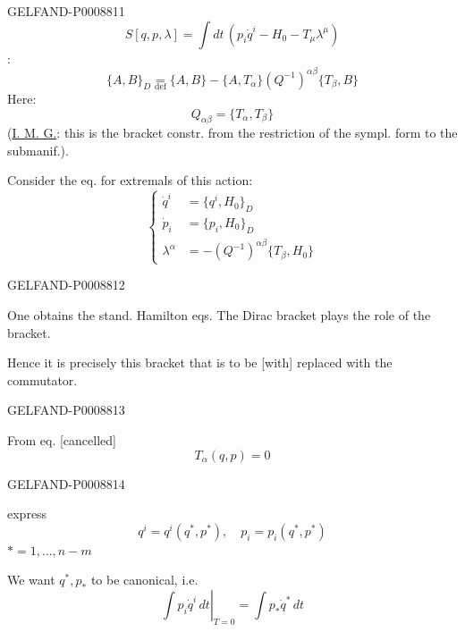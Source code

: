 \begin{GelfandAdjacentEvidence}{GELFAND-P000881}{1}
\begin{equation*}
S[q,p,\lambda]=\int dt\,(p_i\dot q^i-H_0-T_\mu\lambda^\mu)
\tag{11}
\end{equation*}
:
\begin{equation*}
\{A,B\}_D\underset{\mathrm{def}}{=}
\{A,B\}-\{A,T_\alpha\}(Q^{-1})^{\alpha\beta}\{T_\beta,B\}
\tag{12}
\end{equation*}
Here:
\begin{equation*}
Q_{\alpha\beta}=\{T_\alpha,T_\beta\}
\tag{13}
\end{equation*}
(\uline{I. M. G.}: this is the bracket constr. from the restriction of the sympl. form to the submanif.).

Consider the eq. for extremals of this action:
\begin{equation*}
\left\{\begin{aligned}
\dot q^i&=\{q^i,H_0\}_D\\
\dot p_i&=\{p_i,H_0\}_D\\
\lambda^\alpha&=-(Q^{-1})^{\alpha\beta}\{T_\beta,H_0\}
\end{aligned}\right.
\tag{14}
\end{equation*}
\end{GelfandAdjacentEvidence}
\begin{GelfandAdjacentEvidence}{GELFAND-P000881}{2}


One obtains the stand. Hamilton eqs.
The Dirac bracket plays the role of the bracket.

Hence it is precisely this bracket that is to be [with] replaced with the commutator.
\end{GelfandAdjacentEvidence}
\begin{GelfandAdjacentEvidence}{GELFAND-P000881}{3}


From eq. [cancelled]
\begin{equation*}
T_\alpha(q,p)=0
\tag{15}
\end{equation*}
\end{GelfandAdjacentEvidence}
\begin{GelfandAdjacentEvidence}{GELFAND-P000881}{4}


express
\begin{equation*}
q^i=q^i(q^*,p^*),\quad p_i=p_i(q^*,p^*)
\tag{16}
\end{equation*}
$*=1,\ldots,n-m$

We want $q^*,p_*$ to be canonical, i.e.
\begin{equation*}
\left.\int p_i\dot q^i\,dt\right|_{T=0}=\int p_*\dot q^*\,dt
\tag{17}
\end{equation*}
\end{GelfandAdjacentEvidence}
